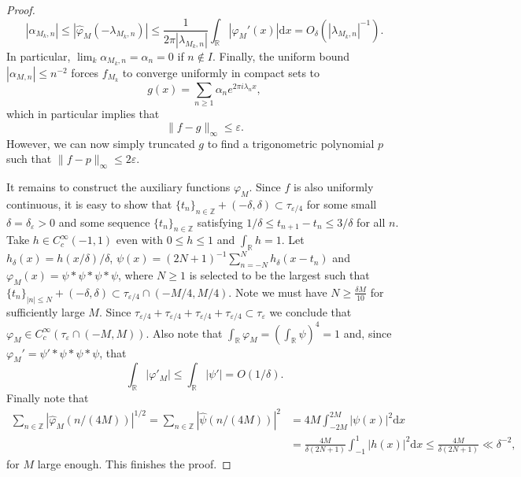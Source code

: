 \documentclass[10pt,a4paper]{amsart}
\newcommand{\al}{\alpha}
\newcommand{\ep}{\varepsilon}
\newcommand{\ft}{\widehat}
\newcommand{\la}{\lambda}
\newcommand{\p}{\varphi}
\newcommand{\z}{\mathbb{Z}}
\renewcommand{\d}{\mathrm{d}}
\renewcommand{\r}{\mathbb{R}}
\begin{document}
\begin{proof}
$$
|\al_{M_k,n}| \leq |\ft \p_M(-\la_{M_k,n})|  \leq  \frac{1}{2\pi |\la_{M_k,n}|} \int_{\r} |\p_M'(x)|\d x  = O_\delta(|\la_{M_k,n}|^{-1}).
$$
In particular, $\lim_k \al_{M_k,n} = \al_n=0$ if $n\notin I$. Finally, the uniform bound $|\al_{M,n}|\leq n^{-2}$ forces $f_{M_k}$ to converge uniformly in compact sets to 
$$
g(x) =  \sum_{n\geq 1} \al_{n} e^{2\pi i \la_{n} x},
$$
which in particular implies that
$$
\|f-g\|_\infty \leq \ep.
$$
However, we can now simply truncated $g$ to find a trigonometric polynomial $p$ such that $\|f-p\|_\infty \leq 2\ep$.

It remains to construct the auxiliary functions $\p_M$. Since $f$ is also uniformly continuous, it is easy to show that $\{t_n\}_{n\in \z} + (-\delta,\delta) \subset \tau_{\ep/4}$ for some small $\delta=\delta_\ep>0$ and some sequence $\{t_n\}_{n\in \z}$ satisfying $1/\delta \leq t_{n+1}-t_n \leq 3/\delta$ for all $n$. Take $h \in C^\infty_c(-1,1)$ even with $0\leq h\leq 1$ and $\int_\r h=1$. Let $h_\delta(x)=h(x/\delta)/\delta$, $\psi(x)=(2N+1)^{-1}\sum_{n=-N}^N h_\delta(x-t_n)$ and $\p_M(x)=\psi * \psi *\psi * \psi$, where $N\geq 1$ is selected to be the largest such that $\{t_n\}_{|n|\leq N} + (-\delta,\delta) \subset \tau_{\ep/4}\cap (-M/4,M/4)$. Note we must have $N\geq \frac{\delta M}{10}$ for sufficiently large $M$. Since $\tau_{\ep/4} + \tau_{\ep/4}+\tau_{\ep/4}+\tau_{\ep/4}\subset \tau_\ep$ we conclude that $\p_M \in C^\infty_c(\tau_\ep \cap (-M,M))$. Also note that $\int_\r \p_M = (\int_\r \psi)^4 = 1$ and, since $\p_M'=\psi'*\psi*\psi *\psi$, that 
$$
\int_\r |\p'_M| \leq \int _\r|\psi'|  = O(1/\delta).
$$
Finally note that 
\begin{align*}
\sum_{n\in\z} |\ft \p_M(n/(4M))|^{1/2} = \sum_{n\in\z} |\ft \psi(n/(4M))|^{2} & = 4M \int_{-2M}^{2M}|\psi(x)|^2\d x \\ & = \frac{4M}{\delta (2N+1)} \int_{-1}^1 |h(x)|^2 \d x  \leq \frac{4M}{\delta (2N+1)}  \ll \delta^{-2},
\end{align*}
for $M$ large enough. This finishes the proof.
\end{proof}
\end{document}
